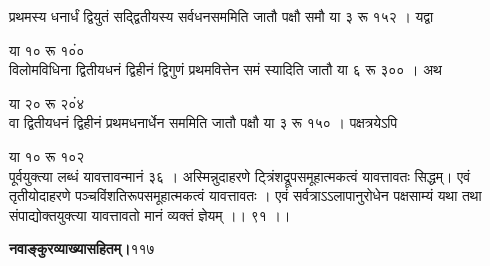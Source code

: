 \documentclass[11pt, openany]{book}
\begin{document}
\begin{sloppypar}
\hangindent=0.2in प्रथमस्य धनार्धं द्वियुतं सद्द्वितीयस्य सर्वधनसममिति जातौ पक्षौ समौ या ३ रू १५२ । यद्वा 

\hspace{4.25in}या १० रू १०ं० \\

\hangindent=0.2in विलोमविधिना द्वितीयधनं द्विहीनं द्विगुणं प्रथमवित्तेन समं स्यादिति जातौ या ६ रू ३०० । अथ 

\hspace{4.5in}या २० रू २०ं४ \\

\hangindent=0.2in वा द्वितीयधनं द्विहीनं प्रथमधनार्धेन सममिति जातौ पक्षौ या ३ रू १५० । पक्षत्रयेऽपि

\hspace{3.5in}या १० रू १०२ \\

\hangindent=0.2in पूर्वयुक्त्या लब्धं यावत्तावन्मानं ३६ । अस्मिन्नुदाहरणे ट्त्रिंशद्रूपसमूहात्मकत्वं यावत्तावतः सिद्धम्। एवं तृतीयोदाहरणे पञ्चविंशतिरूपसमूहात्मकत्वं यावत्तावतः । एवं सर्वत्राऽऽलापानुरोधेन पक्षसाम्यं यथा तथा संपाद्योक्तयुक्त्या यावत्तावतो मानं व्यक्तं ज्ञेयम् ।। ९१ ।।
\end{sloppypar}
\thispagestyle{empty}
\newpage

\onehalfspacing
\hspace{2in}\textbf{नवाङ्कुरव्याख्यासहितम्।}\hspace{2in}११७

\vspace{5mm}
\end{document}
